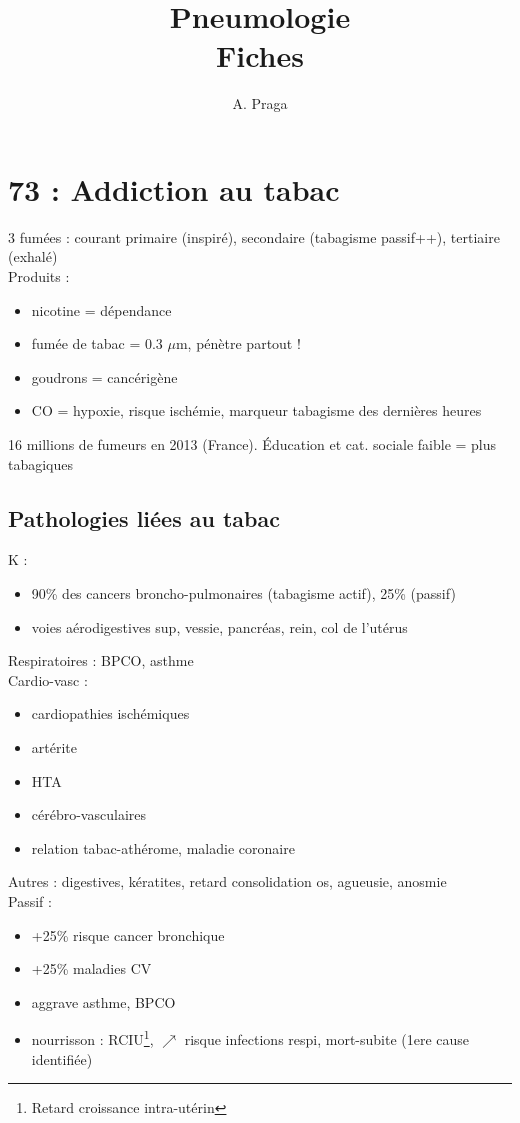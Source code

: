 \documentclass{article}
\title{Pneumologie\\
  \large Fiches}
\author{A. Praga}
\begin{document}
\maketitle
\tableofcontents



\section{73 : Addiction au tabac}
3 fumées : courant primaire (inspiré), secondaire (tabagisme passif++), tertiaire (exhalé)\\
Produits :
\begin{itemize}
\item nicotine = dépendance
\item fumée de tabac = 0.3 $\mu$m, pénètre partout !
\item goudrons = cancérigène
\item CO = hypoxie, risque ischémie, marqueur tabagisme des dernières heures
\end{itemize}
16 millions de fumeurs en 2013 (France). Éducation et cat. sociale faible = plus
tabagiques
\subsection{Pathologies liées au tabac}
K :
\begin{itemize}
\item 90\% des cancers broncho-pulmonaires (tabagisme actif), 25\% (passif) 
\item voies aérodigestives sup, vessie, pancréas, rein, col de l'utérus
\end{itemize}
Respiratoires : BPCO, asthme\\
Cardio-vasc : 
\begin{itemize}
\item cardiopathies ischémiques
\item artérite
\item HTA
\item cérébro-vasculaires
\item relation tabac-athérome, maladie coronaire
\end{itemize}
Autres : digestives, kératites, retard consolidation os, agueusie, anosmie\\
Passif :
\begin{itemize}
\item +25\% risque cancer bronchique
\item +25\% maladies CV
\item aggrave asthme, BPCO
\item nourrisson : RCIU\footnote{Retard croissance intra-utérin}, \(\nearrow\) risque
  infections respi, mort-subite (1ere cause identifiée)
\end{itemize}
\end{document}
